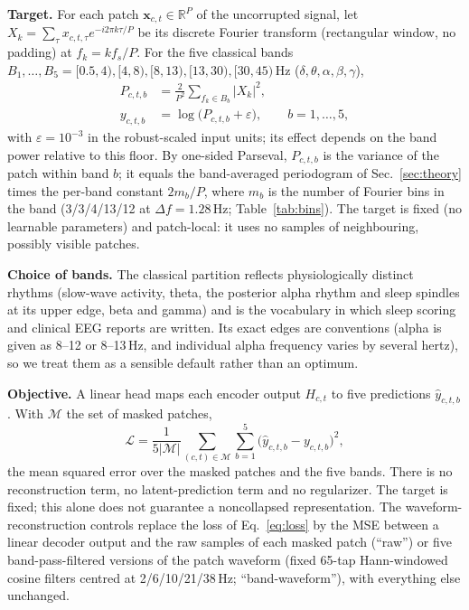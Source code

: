 \noindent\textbf{Target.} For each patch $\bm{x}_{c,t}\in\mathbb{R}^{P}$ of the uncorrupted
signal, let $X_k=\sum_{\tau}x_{c,t,\tau}e^{-i2\pi k\tau/P}$ be its discrete Fourier transform
(rectangular window, no padding) at $f_k=kf_s/P$. For the five classical bands
$B_1,\dots,B_5=[0.5,4),[4,8),[8,13),[13,30),[30,45)$\,Hz
($\delta,\theta,\alpha,\beta,\gamma$),
\begin{align}
P_{c,t,b}&=\frac{2}{P^2}\sum_{f_k\in B_b}|X_k|^2,\nonumber\\
y_{c,t,b}&=\log\bigl(P_{c,t,b}+\varepsilon\bigr),\qquad b=1,\dots,5, \label{eq:target}
\end{align}
with $\varepsilon=10^{-3}$ in the robust-scaled input units; its effect depends on the band
power relative to this floor. By one-sided Parseval, $P_{c,t,b}$ is the variance of
the patch within band $b$; it equals the band-averaged periodogram of Sec.~\ref{sec:theory}
times the per-band constant $2m_b/P$, where $m_b$ is the number of Fourier bins in the band
(3/3/4/13/12 at $\Delta f=1.28$\,Hz; Table~\ref{tab:bins}). The target is fixed (no learnable
parameters) and patch-local: it uses no samples of neighbouring, possibly visible patches.

\noindent\textbf{Choice of bands.} The classical partition reflects physiologically distinct
rhythms (slow-wave activity, theta, the posterior alpha rhythm and sleep spindles at its upper
edge, beta and gamma) and is the vocabulary in which sleep scoring and clinical EEG reports are
written. Its exact edges are conventions (alpha is given as 8--12 or 8--13\,Hz, and individual
alpha frequency varies by several hertz), so we treat them as a sensible default rather than
an optimum.

\noindent\textbf{Objective.} A linear head maps each encoder output $H_{c,t}$ to five
predictions $\hat y_{c,t,b}$. With $\mathcal{M}$ the set of masked patches,
\begin{equation}
\mathcal{L}=\frac{1}{5|\mathcal{M}|}\sum_{(c,t)\in\mathcal{M}}\sum_{b=1}^{5}
\bigl(\hat y_{c,t,b}-y_{c,t,b}\bigr)^2,
\label{eq:loss}
\end{equation}
the mean squared error over the masked patches and the five bands. There is no
reconstruction term, no latent-prediction term and no regularizer. The target is fixed;
this alone does not guarantee a noncollapsed representation. The waveform-reconstruction controls replace the loss of
Eq.~\eqref{eq:loss} by the MSE between a linear decoder output and the raw samples of each
masked patch (``raw'') or five band-pass-filtered versions of the patch waveform (fixed 65-tap
Hann-windowed cosine filters centred at 2/6/10/21/38\,Hz; ``band-waveform''), with everything
else unchanged.
